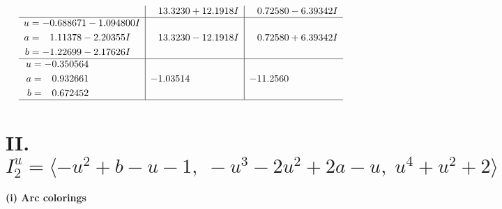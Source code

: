 \documentclass[1p]{elsarticle_modified}
\theoremstyle{definition}
\begin{document}
$$\begin{array}{c|c|c}
 & \phantom{-}13.3230 + 12.1918 I & \phantom{-}0.72580 - 6.39342 I \\ \hline\begin{aligned}
u &= -0.688671 - 1.094800 I \\
a &= \phantom{-}1.11378 - 2.20355 I \\
b &= -1.22699 - 2.17626 I\end{aligned}
 & \phantom{-}13.3230 - 12.1918 I & \phantom{-}0.72580 + 6.39342 I \\ \hline\begin{aligned}
u &= -0.350564\phantom{ +0.000000I} \\
a &= \phantom{-}0.932661\phantom{ +0.000000I} \\
b &= \phantom{-}0.672452\phantom{ +0.000000I}\end{aligned}
 & -1.03514\phantom{ +0.000000I} & -11.2560\phantom{ +0.000000I}\\
 \hline 
 \end{array}$$\newpage\newpage\renewcommand{\arraystretch}{1}
\centering \section*{II. $I^u_{2}= \langle - u^2+b- u-1,\;- u^3-2 u^2+2 a- u,\;u^4+u^2+2 \rangle$}
\flushleft \textbf{(i) Arc colorings}\\
\end{document}
